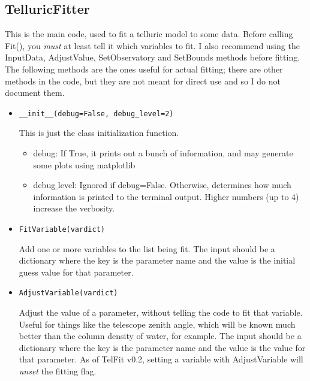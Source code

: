 \documentclass{article}
\begin{document}
\subsection{TelluricFitter}
This is the main code, used to fit a telluric model to some data. Before calling Fit(), you \emph{must} at least tell it which variables to fit. I also recommend using the InputData, AdjustValue, SetObservatory and SetBounds methods before fitting. The following methods are the ones useful for actual fitting; there are other methods in the code, but they are not meant for direct use and so I do not document them.


\begin{itemize}

  \item \begin{Verbatim}[commandchars=\\\{\}]
__init__(debug=False, debug_level=2)
    \end{Verbatim}
    This is just the class initialization function.
  
  \begin{itemize}
    \item debug: If True, it prints out a bunch of information, and may generate some plots using matplotlib
    \item debug$\_$level: Ignored if debug=False. Otherwise, determines how much information is printed to the terminal output. Higher numbers (up to 4) increase the verbosity.
  \end{itemize}
  
  
  \item \begin{Verbatim}[commandchars=\\\{\}]
FitVariable(vardict)
    \end{Verbatim}
    Add one or more variables to the list being fit. The input should be a dictionary where the key is the parameter name and the value is the initial guess value for that parameter.
    
  \item \begin{Verbatim}[commandchars=\\\{\}]
AdjustVariable(vardict)
    \end{Verbatim}
    Adjust the value of a parameter, without telling the code to fit that variable. Useful for things like the telescope zenith angle, which will be known much better than the column density of water, for example. The input should be a dictionary where the key is the parameter name and the value is the  value for that parameter. As of TelFit v0.2, setting a variable with AdjustVariable will \emph{unset} the fitting flag. 
    

\end{itemize}
\end{document}
